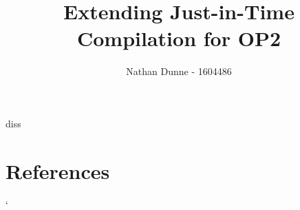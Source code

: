 \documentclass[11pt]{article}
\title{Extending Just-in-Time Compilation for OP2}
\author{Nathan Dunne - 1604486}
\begin{document}
\maketitle


\clearpage
\begin{btSect}{diss}
\section*{References}
\btPrintCited
\end{btSect}`
\end{document}
